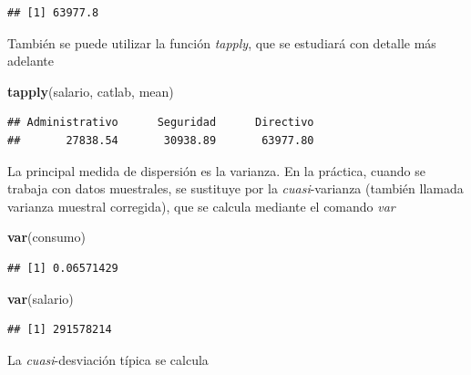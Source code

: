 \documentclass[]{book}
\newenvironment{Shaded}{\begin{snugshade}}{\end{snugshade}}
\newcommand{\KeywordTok}[1]{\textcolor[rgb]{0.13,0.29,0.53}{\textbf{#1}}}
\newcommand{\StringTok}[1]{\textcolor[rgb]{0.31,0.60,0.02}{#1}}
\newcommand{\OperatorTok}[1]{\textcolor[rgb]{0.81,0.36,0.00}{\textbf{#1}}}
\newcommand{\NormalTok}[1]{#1}
\begin{document}
\begin{Shaded}
\end{Shaded}

\begin{verbatim}
## [1] 63977.8
\end{verbatim}

También se puede utilizar la función \emph{tapply}, que se estudiará con
detalle más adelante

\begin{Shaded}
\begin{Highlighting}[]
\KeywordTok{tapply}\NormalTok{(salario, catlab, mean)}
\end{Highlighting}
\end{Shaded}

\begin{verbatim}
## Administrativo      Seguridad      Directivo 
##       27838.54       30938.89       63977.80
\end{verbatim}

La principal medida de dispersión es la varianza. En la práctica, cuando
se trabaja con datos muestrales, se sustituye por la
\emph{cuasi}-varianza (también llamada varianza muestral corregida), que
se calcula mediante el comando \emph{var}

\begin{Shaded}
\begin{Highlighting}[]
\KeywordTok{var}\NormalTok{(consumo)}
\end{Highlighting}
\end{Shaded}

\begin{verbatim}
## [1] 0.06571429
\end{verbatim}

\begin{Shaded}
\begin{Highlighting}[]
\KeywordTok{var}\NormalTok{(salario)}
\end{Highlighting}
\end{Shaded}

\begin{verbatim}
## [1] 291578214
\end{verbatim}

La \emph{cuasi}-desviación típica se calcula
\end{document}
